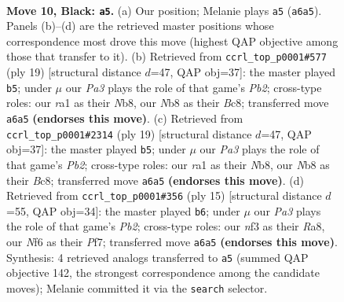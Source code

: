 \documentclass[11pt]{article}
\begin{document}
\clearpage

\begin{figure}[p]\centering
\begin{subfigure}{0.46\textwidth}\centering
\resizebox{\linewidth}{!}{%
\newchessgame
\chessboard[
  setfen={rnbkr3/1p3ppp/p3pn2/2b5/P7/1B2PN2/1P3PPP/RNB2RK1 b - - 0 10},
  showmover=false,
  pgfstyle=straightmove, color=movearrow, markmove={a6-a5}
]}
\caption{}
\end{subfigure}\hfill
\begin{subfigure}{0.46\textwidth}\centering
\resizebox{\linewidth}{!}{%
\newchessgame
\chessboard[
  setfen={rnb4r/1p2kppp/p3pn2/2b5/8/2N1PN2/PP2BPPP/R1B2RK1 b - - 3 10},
  showmover=false,
  pgfstyle=straightmove, color=movearrow, markmove={b7-b5}
]}
\caption{}
\end{subfigure}
\\[4pt]
\begin{subfigure}{0.46\textwidth}\centering
\resizebox{\linewidth}{!}{%
\newchessgame
\chessboard[
  setfen={rnb4r/1p2kppp/p3pn2/2b5/8/2N1PN2/PP2BPPP/R1B2RK1 b - - 3 10},
  showmover=false,
  pgfstyle=straightmove, color=movearrow, markmove={b7-b5}
]}
\caption{}
\end{subfigure}\hfill
\begin{subfigure}{0.46\textwidth}\centering
\resizebox{\linewidth}{!}{%
\newchessgame
\chessboard[
  setfen={rnbk3r/pp2ppbp/5np1/2p5/2P1P2P/2N1B3/PP3PP1/R3KBNR b KQ - 1 8},
  showmover=false,
  pgfstyle=straightmove, color=movearrow, markmove={b7-b6}
]}
\caption{}
\end{subfigure}
\caption{\textbf{Move 10, Black: \texttt{a5}.} (a) Our position; Melanie plays \texttt{a5} (\texttt{a6a5}). Panels (b)--(d) are the retrieved master positions whose correspondence most drove this move (highest QAP objective among those that transfer to it). (b) Retrieved from \texttt{ccrl\_top\_p0001\#577} (ply 19) [structural distance $d$=47, QAP obj=37]: the master played \texttt{b5}; under $\mu$ our \emph{Pa3} plays the role of that game's \emph{Pb2}; cross-type roles: our \emph{r}a1 as their \emph{N}b8, our \emph{N}b8 as their \emph{B}c8; transferred move \texttt{a6a5} \textbf{(endorses this move)}. (c) Retrieved from \texttt{ccrl\_top\_p0001\#2314} (ply 19) [structural distance $d$=47, QAP obj=37]: the master played \texttt{b5}; under $\mu$ our \emph{Pa3} plays the role of that game's \emph{Pb2}; cross-type roles: our \emph{r}a1 as their \emph{N}b8, our \emph{N}b8 as their \emph{B}c8; transferred move \texttt{a6a5} \textbf{(endorses this move)}. (d) Retrieved from \texttt{ccrl\_top\_p0001\#356} (ply 15) [structural distance $d$=55, QAP obj=34]: the master played \texttt{b6}; under $\mu$ our \emph{Pa3} plays the role of that game's \emph{Pb2}; cross-type roles: our \emph{n}f3 as their \emph{R}a8, our \emph{N}f6 as their \emph{P}f7; transferred move \texttt{a6a5} \textbf{(endorses this move)}. Synthesis: 4 retrieved analogs transferred to \texttt{a5} (summed QAP objective 142, the strongest correspondence among the candidate moves); Melanie committed it via the \texttt{search} selector.}
\label{fig:thought-m19}
\end{figure}
\end{document}
